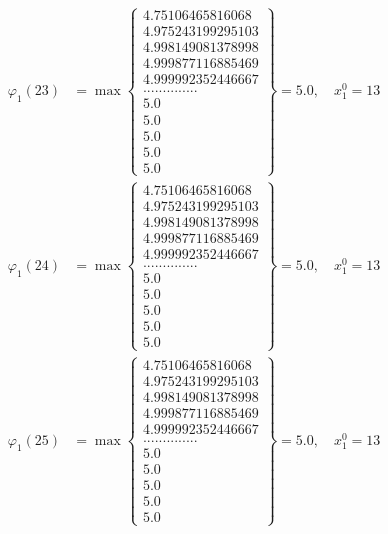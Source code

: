 \documentclass{article}
\begin{document}
\begin{align*}
  
  
  
\varphi_{1}(23) &= \max \left\{ \begin{array}{c}
4.75106465816068 \\
 4.975243199295103 \\
 4.998149081378998 \\
 4.999877116885469 \\
 4.999992352446667 \\
 .............. \\
 5.0 \\
 5.0 \\
 5.0 \\
 5.0 \\
 5.0
\end{array} \right\} = 5.0, \quad x_{1}^0 = 13\\
  
  
  
  
\varphi_{1}(24) &= \max \left\{ \begin{array}{c}
4.75106465816068 \\
 4.975243199295103 \\
 4.998149081378998 \\
 4.999877116885469 \\
 4.999992352446667 \\
 .............. \\
 5.0 \\
 5.0 \\
 5.0 \\
 5.0 \\
 5.0
\end{array} \right\} = 5.0, \quad x_{1}^0 = 13\\
  
  
  
  
\varphi_{1}(25) &= \max \left\{ \begin{array}{c}
4.75106465816068 \\
 4.975243199295103 \\
 4.998149081378998 \\
 4.999877116885469 \\
 4.999992352446667 \\
 .............. \\
 5.0 \\
 5.0 \\
 5.0 \\
 5.0 \\
 5.0
\end{array} \right\} = 5.0, \quad x_{1}^0 = 13\\
  

\end{align*}
\end{document}
